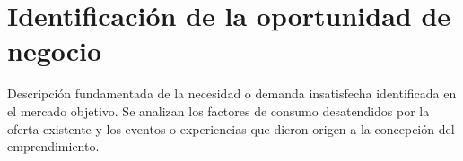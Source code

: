 \section{Identificación de la oportunidad de negocio}
\label{sec:oportunidad_negocio}

Descripción fundamentada de la necesidad o demanda insatisfecha identificada en el mercado objetivo. Se analizan los factores de consumo desatendidos por la oferta existente y los eventos o experiencias que dieron origen a la concepción del emprendimiento.
